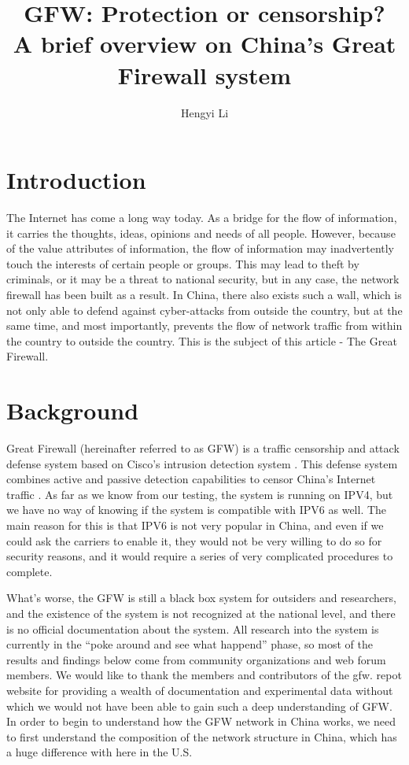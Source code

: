 \documentclass[11pt]{article}
\title{GFW: Protection or censorship?\\ \large A brief overview on China's Great Firewall system}
\author{Hengyi Li}
\begin{document}
\maketitle

\section{Introduction}

The Internet has come a long way today. As a bridge for the flow of information,
it carries the thoughts, ideas, opinions and needs of all people. However,
because of the value attributes of information, the flow of information may
inadvertently touch the interests of certain people or groups. This may lead to
theft by criminals, or it may be a threat to national security, but in any case,
the network firewall has been built as a result. In China, there also exists
such a wall, which is not only able to defend against cyber-attacks from outside
the country, but at the same time, and most importantly, prevents the flow of
network traffic from within the country to outside the country. This is the
subject of this article - The Great Firewall.

\section{Background}
Great Firewall (hereinafter referred to as GFW) is a traffic censorship and
attack defense system based on Cisco's intrusion detection system \cite{CISCO}.
This defense system combines active and passive detection capabilities to censor
China's Internet traffic \cite{DetectBlockShadowSocks}. As far as we know from
our testing, the system is running on IPV4, but we have no way of knowing if the
system is compatible with IPV6 as well. The main reason for this is that IPV6 is
not very popular in China, and even if we could ask the carriers to enable it,
they would not be very willing to do so for security reasons, and it would
require a series of very complicated procedures to complete.

What's worse, the GFW is still a black box system for outsiders and researchers,
and the existence of the system is not recognized at the national level, and
there is no official documentation about the system. All research into the
system is currently in the ``poke around and see what happend'' phase, so most
of the results and findings below come from community organizations and web
forum members. We would like to thank the members and contributors of the gfw.
repot \cite{GFWReport} website for providing a wealth of documentation and
experimental data without which we would not have been able to gain such a deep
understanding of GFW. In order to begin to understand how the GFW network in
China works, we need to first understand the composition of the network
structure in China, which has a huge difference with here in the U.S.
\end{document}

